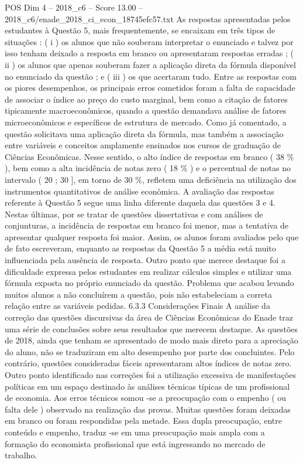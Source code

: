 \begin{textsample}{POS Dim 4 – 2018\_c6 – Score 13.00 – 2018\_c6/enade\_2018\_ci\_econ\_18745efc57.txt}
As respostas apresentadas pelos estudantes à Questão 5, mais frequentemente, se encaixam em três tipos de situações : ( i ) os alunos que não souberam interpretar o enunciado e talvez por isso tenham deixado a resposta em branco ou apresentaram respostas erradas ; ( ii ) os alunos que apenas souberam fazer a aplicação direta da fórmula disponível no enunciado da questão ; e ( iii ) os que acertaram tudo.
Entre as respostas com os piores desempenhos, os principais erros cometidos foram a falta de capacidade de associar o índice ao preço do custo marginal, bem como a citação de fatores tipicamente macroeconômicos, quando a questão demandava análise de fatores microeconômicos e específicos de estrutura de mercado.
Como já comentado, a questão solicitava uma aplicação direta da fórmula, mas também a associação entre variáveis e conceitos amplamente ensinados nos cursos de graduação de Ciências Econômicas.
Nesse sentido, o alto índice de respostas em branco ( 38 \% ), bem como a alta incidência de notas zero ( 18 \% ) e o percentual de notas no intervalo ( 20 ; 30 ], em torno de 30 \%, refletem uma deficiência na utilização dos instrumentos quantitativos de análise econômica.
A avaliação das respostas referente à Questão 5 segue uma linha diferente daquela das questões 3 e 4.
Nestas últimas, por se tratar de questões dissertativas e com análises de conjunturas, a incidência de respostas em branco foi menor, mas a tentativa de apresentar qualquer resposta foi maior.
Assim, os alunos foram avaliados pelo que de fato escreveram, enquanto as respostas da Questão 5 a média está muito influenciada pela ausência de resposta.
Outro ponto que merece destaque foi a dificuldade expressa pelos estudantes em realizar cálculos simples e utilizar uma fórmula exposta no próprio enunciado da questão.
Problema que acabou levando muitos alunos a não concluírem a questão, pois não estabeleciam a correta relação entre as variáveis pedidas. 6.3.3 Considerações Finais A análise da correção das questões discursivas da área de Ciências Econômicas do Enade traz uma série de conclusões sobre seus resultados que merecem destaque.
As questões de 2018, ainda que tenham se apresentado de modo mais direto para a apreciação do aluno, não se traduziram em alto desempenho por parte dos concluintes.
Pelo contrário, questões consideradas fáceis apresentaram altos índices de notas zero.
Outro ponto identificado nas correções foi a utilização excessiva de manifestações políticas em um espaço destinado às análises técnicas típicas de um profissional de economia.
Aos erros técnicos somou -se a preocupação com o empenho ( ou falta dele ) observado na realização das provas.
Muitas questões foram deixadas em branco ou foram respondidas pela metade.
Essa dupla preocupação, entre conteúdo e empenho, traduz -se em uma preocupação mais ampla com a formação do economista profissional que está ingressando no mercado de trabalho.

\end{textsample}
